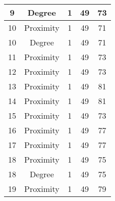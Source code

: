\documentclass[results.tex]{subfiles}
\begin{document}
\begin{center}
\begin{tabular}{| c || c | c | c | c |}
            \hline
            9                       & Degree                       & 1                      & 49                      & 73                   \\
            \hline
            10                      & Proximity                    & 1                      & 49                      & 71                   \\
            \hline
            10                      & Degree                       & 1                      & 49                      & 71                   \\
            \hline
            11                      & Proximity                    & 1                      & 49                      & 73                   \\
            \hline
            12                      & Proximity                    & 1                      & 49                      & 73                   \\
            \hline
            13                      & Proximity                    & 1                      & 49                      & 81                   \\
            \hline
            14                      & Proximity                    & 1                      & 49                      & 81                   \\
            \hline
            15                      & Proximity                    & 1                      & 49                      & 73                   \\
            \hline
            16                      & Proximity                    & 1                      & 49                      & 77                   \\
            \hline
            17                      & Proximity                    & 1                      & 49                      & 77                   \\
            \hline
            18                      & Proximity                    & 1                      & 49                      & 75                   \\
            \hline
            18                      & Degree                       & 1                      & 49                      & 75                   \\
            \hline
            19                      & Proximity                    & 1                      & 49                      & 79                   \\

\end{tabular}
\end{center}
\end{document}
